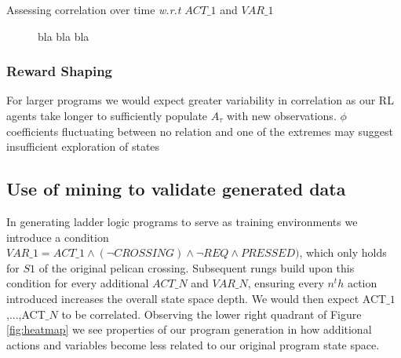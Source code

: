 \documentclass[runningheads]{llncs}
\begin{document}
Assessing correlation over time \textit{w.r.t} $ACT\_1$ and $VAR\_1$

\begin{figure}[ht]
	\centering
\hfil
{}%
\caption{bla bla bla}
\label{fig:test}%
\end{figure}

\subsubsection{Reward Shaping}
For larger programs we would expect greater variability in correlation as our RL agents take longer to sufficiently populate $A_\tau$ with new observations. $\phi$ coefficients fluctuating between no relation and one of the extremes may suggest insufficient exploration of states 


\subsection{Use of mining to validate generated data}
In generating ladder logic programs to serve as training environments we introduce a condition $VAR\_1 = ACT\_1 \land (\lnot CROSSING) \land \lnot REQ \land PRESSED)$, which only holds for $S1$ of the original pelican crossing. Subsequent rungs build upon this condition for every additional $ACT\_N$ and $VAR\_N$, ensuring every $n^th$ action introduced increases the overall state space depth. We would then expect ACT$\_1$,...,ACT$\_N$ to be correlated.  
Observing the lower right quadrant of Figure \ref{fig:heatmap} we see properties of our program generation in how additional actions and variables become less related to our original program state space.   
\end{document}
